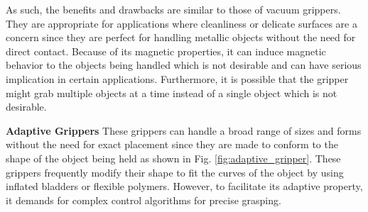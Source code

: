As such, the benefits and drawbacks are similar to those of vacuum grippers. They are appropriate for applications where cleanliness or delicate surfaces are a concern since they are perfect for handling metallic objects without the need for direct contact. Because of its magnetic properties, it can induce magnetic behavior to the objects being handled which is not desirable and can have serious implication in certain applications\cite{spenrath2022heuristic}. Furthermore, it is possible that the gripper might grab multiple objects at a time instead of a single object which is not desirable.\cite{spenrath2022heuristic} 

\vspace{5mm}

\textbf{Adaptive Grippers} These grippers can handle a broad range of sizes and forms without the need for exact placement since they are made to conform to the shape of the object being held as shown in Fig. \ref{fig:adaptive_gripper}. These grippers frequently modify their shape to fit the curves of the object by using inflated bladders or flexible  polymers. However, to facilitate its adaptive property, it demands for complex control algorithms for precise grasping.\cite{park2018hybrid}

\vspace{5mm}

